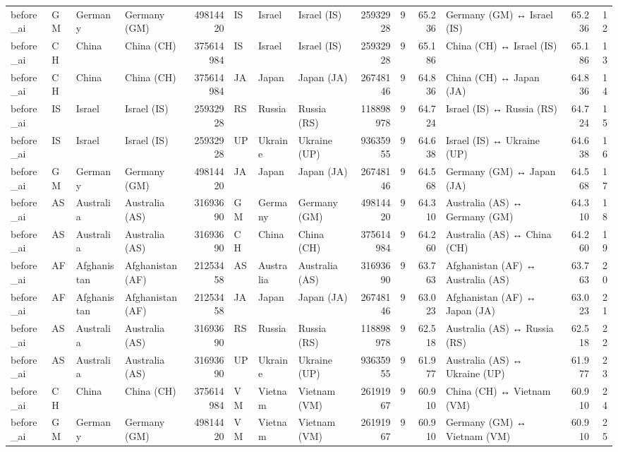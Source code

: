 \begin{tabular}{llllrlllrrrlrr}
before\_ai & GM & Germany & Germany (GM) & 49814420 & IS & Israel & Israel (IS) & 25932928 & 9 & 65.236 & Germany (GM) ↔ Israel (IS) & 65.236 & 12 \\
before\_ai & CH & China & China (CH) & 375614984 & IS & Israel & Israel (IS) & 25932928 & 9 & 65.186 & China (CH) ↔ Israel (IS) & 65.186 & 13 \\
before\_ai & CH & China & China (CH) & 375614984 & JA & Japan & Japan (JA) & 26748146 & 9 & 64.836 & China (CH) ↔ Japan (JA) & 64.836 & 14 \\
before\_ai & IS & Israel & Israel (IS) & 25932928 & RS & Russia & Russia (RS) & 118898978 & 9 & 64.724 & Israel (IS) ↔ Russia (RS) & 64.724 & 15 \\
before\_ai & IS & Israel & Israel (IS) & 25932928 & UP & Ukraine & Ukraine (UP) & 93635955 & 9 & 64.638 & Israel (IS) ↔ Ukraine (UP) & 64.638 & 16 \\
before\_ai & GM & Germany & Germany (GM) & 49814420 & JA & Japan & Japan (JA) & 26748146 & 9 & 64.568 & Germany (GM) ↔ Japan (JA) & 64.568 & 17 \\
before\_ai & AS & Australia & Australia (AS) & 31693690 & GM & Germany & Germany (GM) & 49814420 & 9 & 64.310 & Australia (AS) ↔ Germany (GM) & 64.310 & 18 \\
before\_ai & AS & Australia & Australia (AS) & 31693690 & CH & China & China (CH) & 375614984 & 9 & 64.260 & Australia (AS) ↔ China (CH) & 64.260 & 19 \\
before\_ai & AF & Afghanistan & Afghanistan (AF) & 21253458 & AS & Australia & Australia (AS) & 31693690 & 9 & 63.763 & Afghanistan (AF) ↔ Australia (AS) & 63.763 & 20 \\
before\_ai & AF & Afghanistan & Afghanistan (AF) & 21253458 & JA & Japan & Japan (JA) & 26748146 & 9 & 63.023 & Afghanistan (AF) ↔ Japan (JA) & 63.023 & 21 \\
before\_ai & AS & Australia & Australia (AS) & 31693690 & RS & Russia & Russia (RS) & 118898978 & 9 & 62.518 & Australia (AS) ↔ Russia (RS) & 62.518 & 22 \\
before\_ai & AS & Australia & Australia (AS) & 31693690 & UP & Ukraine & Ukraine (UP) & 93635955 & 9 & 61.977 & Australia (AS) ↔ Ukraine (UP) & 61.977 & 23 \\
before\_ai & CH & China & China (CH) & 375614984 & VM & Vietnam & Vietnam (VM) & 26191967 & 9 & 60.910 & China (CH) ↔ Vietnam (VM) & 60.910 & 24 \\
before\_ai & GM & Germany & Germany (GM) & 49814420 & VM & Vietnam & Vietnam (VM) & 26191967 & 9 & 60.910 & Germany (GM) ↔ Vietnam (VM) & 60.910 & 25 \\

\end{tabular}
